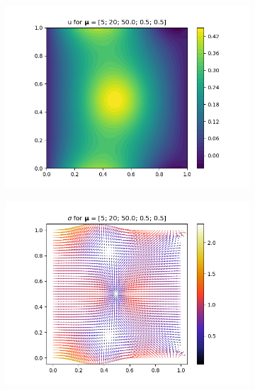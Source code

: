 \begin{figure}[!htb]
\begin{subfigure}{0.35\linewidth}
        \centering
        \includegraphics[width=\linewidth]{figs/mixed_u2_mu2.png}
        \label{subfig:mu2_a}
    \end{subfigure}
    \begin{subfigure}{0.35\linewidth}
        \centering
        \includegraphics[width=\linewidth]{figs/mixed_sigma2_mu2.png}
        \label{subfig:mu2_b}
    \end{subfigure}%
    \begin{subfigure}{0.35\linewidth}
        \centering

\end{subfigure}
\end{figure}
